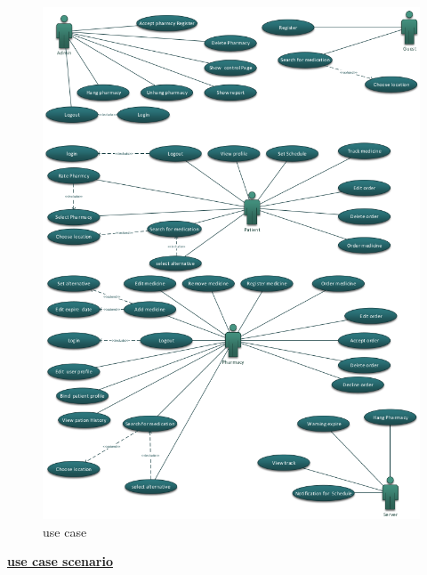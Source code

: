 \documentclass[]{article}
\begin{document}
\begin{figure}[H]
\centering
\includegraphics[scale=0.38]{./usecase}
\caption{use case}
\end{figure}

\textbf{\underline{use case scenario}}
\end{document}
